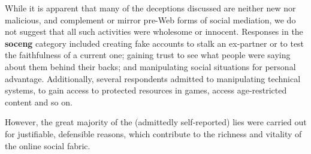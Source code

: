 \documentclass{sig-alternate}
\begin{document}
While it is apparent that many of the deceptions discussed are neither new nor malicious, and complement or mirror pre-Web forms of social mediation, we do not suggest that all such activities were wholesome or innocent. Responses in the \textbf{soceng} category included creating fake accounts to stalk an ex-partner or to test the faithfulness of a current one; gaining trust to see what people were saying about them behind their backs; and manipulating social situations for personal advantage. Additionally, several respondents admitted to manipulating technical systems, to gain access to protected resources in games, access age-restricted content and so on.

However, the great majority of the (admittedly self-reported) lies were carried out for justifiable, defensible reasons, which contribute to the richness and vitality of the online social fabric.








\end{document}

